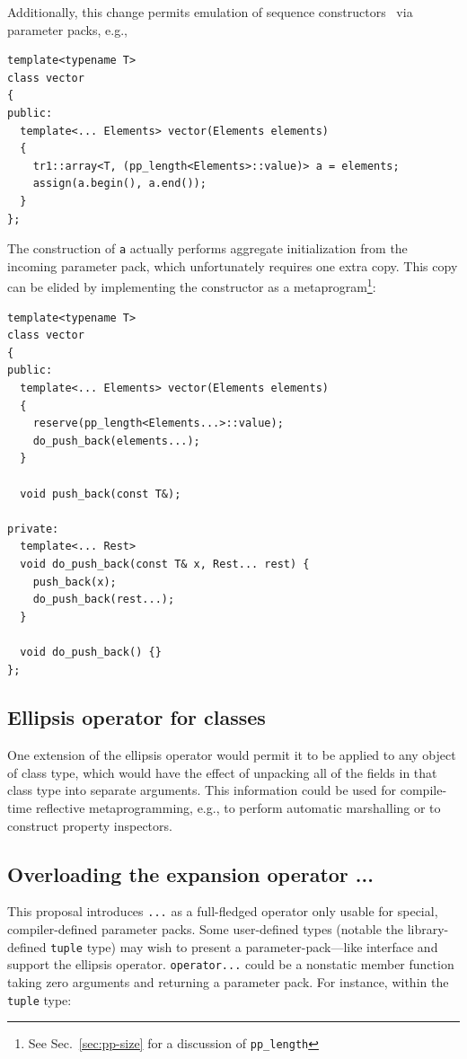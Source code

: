 \documentclass{article}
\begin{document}
Additionally, this change permits emulation of sequence
constructors~\cite{DoReStr03} via parameter packs, e.g.,
\begin{verbatim}
template<typename T>
class vector
{
public:
  template<... Elements> vector(Elements elements)
  {
    tr1::array<T, (pp_length<Elements>::value)> a = elements;
    assign(a.begin(), a.end());
  }
};
\end{verbatim}

The construction of \texttt{a} actually performs aggregate
initialization from the incoming parameter pack, which unfortunately
requires one extra copy. This copy can be elided by implementing the
constructor as a metaprogram\footnote{See Sec.~\ref{sec:pp-size} for a
  discussion of \texttt{pp\_length}}:

\begin{verbatim}
template<typename T>
class vector
{
public:
  template<... Elements> vector(Elements elements)
  {
    reserve(pp_length<Elements...>::value);
    do_push_back(elements...);
  }

  void push_back(const T&);

private:
  template<... Rest>
  void do_push_back(const T& x, Rest... rest) {
    push_back(x);
    do_push_back(rest...);
  }

  void do_push_back() {}
};
\end{verbatim}

\subsection{Ellipsis operator for classes}
One extension of the ellipsis operator would permit it to be applied
to any object of class type, which would have the effect of unpacking
all of the fields in that class type into separate arguments. This
information could be used for compile-time reflective metaprogramming,
e.g., to perform automatic marshalling or to construct property
inspectors. 

\subsection{Overloading the expansion operator ...}
This proposal introduces \texttt{...} as a full-fledged operator only
usable for special, compiler-defined parameter packs. Some
user-defined types (notable the library-defined \texttt{tuple} type)
may wish to present a parameter-pack---like interface and support the
ellipsis operator. \texttt{operator...} could be a nonstatic member
function taking zero arguments and returning a parameter pack. For
instance, within the \texttt{tuple} type:
\end{document}
